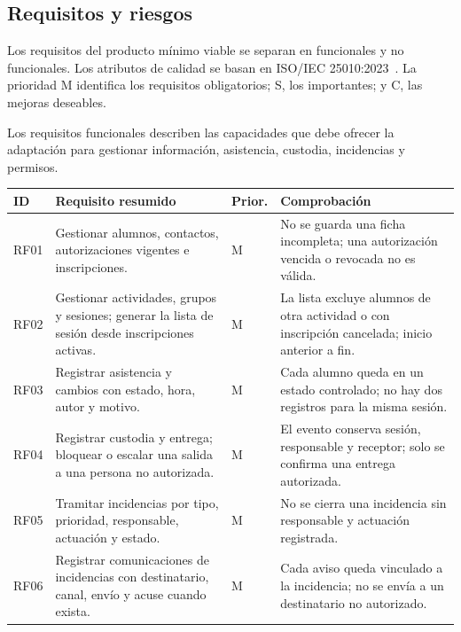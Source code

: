 \subsection{Requisitos y riesgos}\label{sec:1-3-4}

Los requisitos del producto mínimo viable se separan en funcionales y no funcionales. Los atributos de calidad se basan en ISO/IEC 25010:2023~\cite{ref12}. La prioridad M identifica los requisitos obligatorios; S, los importantes; y C, las mejoras deseables.

Los requisitos funcionales describen las capacidades que debe ofrecer la adaptación para gestionar información, asistencia, custodia, incidencias y permisos.

\begin{table}[H]
\centering\small
\begin{tabularx}{\textwidth}{>{\hsize=0.275\hsize\raggedright\arraybackslash}X>{\hsize=1.591\hsize\raggedright\arraybackslash}X>{\hsize=0.436\hsize\raggedright\arraybackslash}X>{\hsize=1.698\hsize\raggedright\arraybackslash}X}
\toprule
\rowcolor{cabeceratabla} \textbf{ID} & \textbf{Requisito resumido} & \textbf{Prior.} & \textbf{Comprobación} \\
\midrule
RF01 & Gestionar alumnos, contactos, autorizaciones vigentes e inscripciones. & M & No se guarda una ficha incompleta; una autorización vencida o revocada no es válida. \\
RF02 & Gestionar actividades, grupos y sesiones; generar la lista de sesión desde inscripciones activas. & M & La lista excluye alumnos de otra actividad o con inscripción cancelada; inicio anterior a fin. \\
RF03 & Registrar asistencia y cambios con estado, hora, autor y motivo. & M & Cada alumno queda en un estado controlado; no hay dos registros para la misma sesión. \\
RF04 & Registrar custodia y entrega; bloquear o escalar una salida a una persona no autorizada. & M & El evento conserva sesión, responsable y receptor; solo se confirma una entrega autorizada. \\
RF05 & Tramitar incidencias por tipo, prioridad, responsable, actuación y estado. & M & No se cierra una incidencia sin responsable y actuación registrada. \\
RF06 & Registrar comunicaciones de incidencias con destinatario, canal, envío y acuse cuando exista. & M & Cada aviso queda vinculado a la incidencia; no se envía a un destinatario no autorizado. \\

\end{tabularx}
\end{table}
